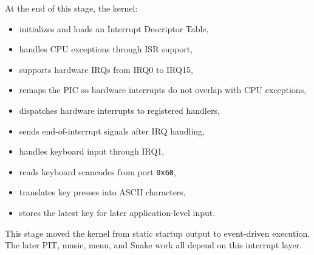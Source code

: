 At the end of this stage, the kernel:
\begin{itemize}
  \item initializes and loads an Interrupt Descriptor Table,
  \item handles CPU exceptions through ISR support,
  \item supports hardware IRQs from IRQ0 to IRQ15,
  \item remaps the PIC so hardware interrupts do not overlap with CPU exceptions,
  \item dispatches hardware interrupts to registered handlers,
  \item sends end-of-interrupt signals after IRQ handling,
  \item handles keyboard input through IRQ1,
  \item reads keyboard scancodes from port \texttt{0x60},
  \item translates key presses into ASCII characters,
  \item stores the latest key for later application-level input.
\end{itemize}

This stage moved the kernel from static startup output to event-driven execution. The later PIT, music, menu, and Snake work all depend on this interrupt layer.
